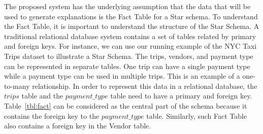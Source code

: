 The proposed system has the underlying assumption that the data that will be used to generate explanations is the Fact Table for a Star schema\cite{giovinazzo2000object,adamson2010star}. To understand the Fact Table, it is important to understand the structure of the Star Schema. A traditional relational database system contains a set of tables related by primary and foreign keys. For instance, we can use our running example of the NYC Taxi Trips dataset to illustrate a Star Schema. The trips, vendors, and payment type can be represented in separate tables. One trip can have a single payment type while a payment type can be used in multiple trips. This is an example of a one-to-many relationship. 
In order to represent this data in a relational database, the $trips$ table and the $payment\_type$ table need to have a primary and foreign key. Table~\ref{tbl:fact} can be considered as the central part of the schema because it contains the foreign key to the $payment\_type$ table. Similarly, such Fact Table also contains a foreign key in the Vendor table.





